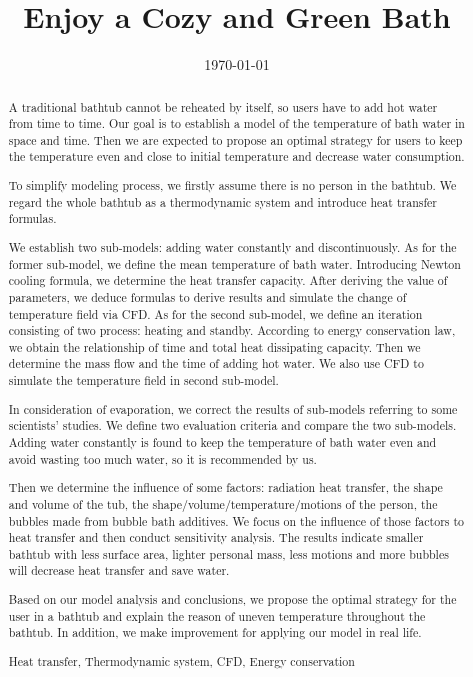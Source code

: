 \documentclass{mcmthesis}
\title{Enjoy a Cozy and Green Bath}
\date{\today}
\begin{document}
\begin{abstract}

A traditional bathtub cannot be reheated by itself, so users have to add hot 
water from time to time. Our goal is to establish a model of the temperature 
of bath water in space and time. Then we are expected to propose an optimal 
strategy for users to keep the temperature even and close to initial temperature 
and decrease water consumption.

To simplify modeling process, we firstly assume there is no person in the bathtub. 
We regard the whole bathtub as a thermodynamic system and introduce heat transfer 
formulas.

We establish two sub-models: adding water constantly and discontinuously. As for 
the former sub-model, we define the mean temperature of bath water. Introducing 
Newton cooling formula, we determine the heat transfer capacity. After deriving 
the value of parameters, we deduce formulas to derive results and simulate the 
change of temperature field via CFD. As for the second sub-model, we define an 
iteration consisting of two process: heating and standby. According to energy 
conservation law, we obtain the relationship of time and total heat dissipating 
capacity. Then we determine the mass flow and the time of adding hot water. We 
also use CFD to simulate the temperature field in second sub-model.

In consideration of evaporation, we correct the results of sub-models referring 
to some scientists' studies. We define two evaluation criteria and compare the 
two sub-models. Adding water constantly is found to keep the temperature of bath 
water even and avoid wasting too much water, so it is recommended by us.

Then we determine the influence of some factors: radiation heat transfer, the 
shape and volume of the tub, the shape/volume/temperature/motions of the person, 
the bubbles made from bubble bath additives. We focus on the influence of those 
factors to heat transfer and then conduct sensitivity analysis. The results 
indicate smaller bathtub with less surface area, lighter personal mass, less 
motions and more bubbles will decrease heat transfer and save water.

Based on our model analysis and conclusions, we propose the optimal strategy for 
the user in a bathtub and explain the reason of uneven temperature throughout 
the bathtub. In addition, we make improvement for applying our model in real life.

\begin{keywords}
Heat transfer, Thermodynamic system, CFD, Energy conservation
\end{keywords}

\end{abstract}
\end{document}

